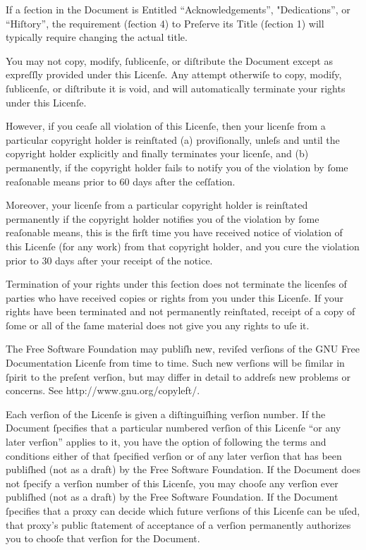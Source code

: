 If a ſection in the Document is Entitled “Acknowledgements”,
"Dedications”, or “Hiſtory”, the requirement (ſection 4) to Preſerve
its Title (ſection 1) will typically require changing the actual
title.



You may not copy, modify, ſublicenſe, or diſtribute the Document
except as expreſſly provided under this Licenſe. Any attempt
otherwiſe to copy, modify, ſublicenſe, or diſtribute it is void, and
will automatically terminate your rights under this Licenſe.

However, if you ceaſe all violation of this Licenſe, then your licenſe
from a particular copyright holder is reinſtated (a) proviſionally,
unleſs and until the copyright holder explicitly and finally
terminates your licenſe, and (b) permanently, if the copyright holder
fails to notify you of the violation by ſome reaſonable means prior to
60 days after the ceſſation.

Moreover, your licenſe from a particular copyright holder is
reinſtated permanently if the copyright holder notifies you of the
violation by ſome reaſonable means, this is the firſt time you have
received notice of violation of this Licenſe (for any work) from that
copyright holder, and you cure the violation prior to 30 days after
your receipt of the notice.

Termination of your rights under this ſection does not terminate the
licenſes of parties who have received copies or rights from you under
this Licenſe. If your rights have been terminated and not permanently
reinſtated, receipt of a copy of ſome or all of the ſame material does
not give you any rights to uſe it.



The Free Software Foundation may publiſh new, reviſed verſions of the
GNU Free Documentation Licenſe from time to time. Such new verſions
will be ſimilar in ſpirit to the preſent verſion, but may differ in
detail to addreſs new problems or concerns. See
http://www.gnu.org/copyleft/.

Each verſion of the Licenſe is given a diſtinguiſhing verſion number.
If the Document ſpecifies that a particular numbered verſion of this
Licenſe “or any later verſion” applies to it, you have the option of
following the terms and conditions either of that ſpecified verſion or
of any later verſion that has been publiſhed (not as a draft) by the
Free Software Foundation. If the Document does not ſpecify a verſion
number of this Licenſe, you may chooſe any verſion ever publiſhed (not
as a draft) by the Free Software Foundation. If the Document
ſpecifies that a proxy can decide which future verſions of this
Licenſe can be uſed, that proxy’s public ſtatement of acceptance of a
verſion permanently authorizes you to chooſe that verſion for the
Document.

